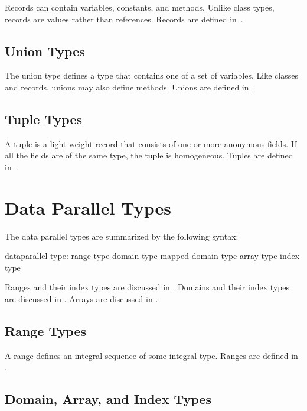 Records can contain variables, constants, and methods. Unlike class
types, records are values rather than references. Records are defined
in~.

\subsection{Union Types}
\label{Types_Union_Types}

The union type defines a type that contains one of a set of variables.
Like classes and records, unions may also define methods.  Unions are
defined in~.

\subsection{Tuple Types}
\label{Types_Tuple_Types}

A tuple is a light-weight record that consists of one or more
anonymous fields.  If all the fields are of the same type, the tuple
is homogeneous.  Tuples are defined in~.

\clearpage
\section{Data Parallel Types}
\label{Data_Parallel_Types}

The data parallel types are summarized by the following syntax:

\begin{syntax}
dataparallel-type:
  range-type
  domain-type
  mapped-domain-type
  array-type
  index-type
\end{syntax}

Ranges and their index types are discussed in .
Domains and their index types are discussed in .
Arrays are discussed in .

\subsection{Range Types}
\label{Types_Range_Types}

A range defines an integral sequence of some integral type.  Ranges
are defined in .

\subsection{Domain, Array, and Index Types}
\label{Domain_and_Array_Types}


